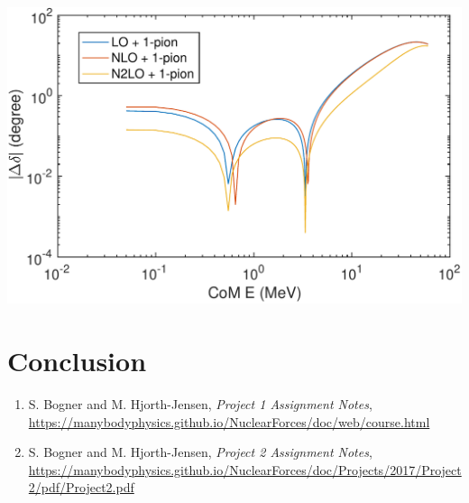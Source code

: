 \documentclass{article}
\newenvironment{Figure}
  {\par\medskip\noindent\minipage{\linewidth}}
  {\endminipage\par\medskip}
\begin{document}
\begin{multicols}{2}
\begin{Figure}
\centering
\includegraphics[width=\textwidth]{ps_diff2.pdf}
\end{Figure}

\section{Conclusion}

\end{multicols}

\hrulefill

\begin{enumerate} %

\item S. Bogner and M. Hjorth-Jensen, \textit{Project 1 Assignment Notes}, \url{https://manybodyphysics.github.io/NuclearForces/doc/web/course.html}

\item S. Bogner and M. Hjorth-Jensen, \textit{Project 2 Assignment Notes}, \url{https://manybodyphysics.github.io/NuclearForces/doc/Projects/2017/Project2/pdf/Project2.pdf}

\end{enumerate}
\end{document}
